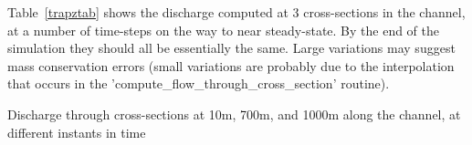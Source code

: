 Table~\ref{trapztab} shows the discharge computed at 3 cross-sections in the channel, at a number of time-steps on the way to near steady-state. By the end of the simulation they should all be essentially the same. Large variations may suggest mass conservation errors (small variations are probably due to the interpolation that occurs in the 'compute\_flow\_through\_cross\_section' routine).

\begin{table}
\caption{Discharge through cross-sections at 10m, 700m, and 1000m along the channel, at different instants in time}
\label{trapztab}
\end{table}

\endinput
